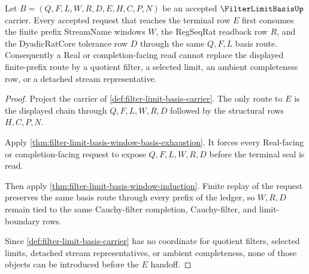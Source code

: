 \begin{theorem}
\label{thm:filter-limit-basis-finite-prefix-stream-consumption}
Let $B=(Q,F,L,W,R,D,E,H,C,P,N)$ be an accepted $\FilterLimitBasisUp$ carrier. Every accepted request that reaches the terminal row $E$ first consumes the finite prefix StreamName windows $W$, the RegSeqRat readback row $R$, and the DyadicRatCore tolerance row $D$ through the same $Q,F,L$ basis route. Consequently a Real or completion-facing read cannot replace the displayed finite-prefix route by a quotient filter, a selected limit, an ambient completeness row, or a detached stream representative.
\end{theorem}
\begin{proof}
Project the carrier of \autoref{def:filter-limit-basis-carrier}. The only route to $E$ is the displayed chain through $Q,F,L,W,R,D$ followed by the structural rows $H,C,P,N$.

Apply \autoref{thm:filter-limit-basis-window-basis-exhaustion}. It forces every Real-facing or completion-facing request to expose $Q,F,L,W,R,D$ before the terminal seal is read.

Then apply \autoref{thm:filter-limit-basis-window-induction}. Finite replay of the request preserves the same basis route through every prefix of the ledger, so $W,R,D$ remain tied to the same Cauchy-filter completion, Cauchy-filter, and limit-boundary rows.

Since \autoref{def:filter-limit-basis-carrier} has no coordinate for quotient filters, selected limits, detached stream representatives, or ambient completeness, none of those objects can be introduced before the $E$ handoff.
\end{proof}

